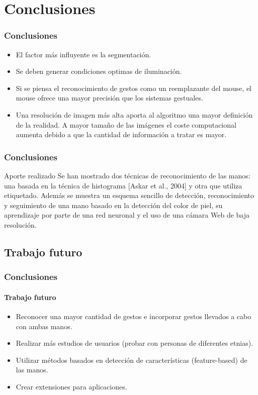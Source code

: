 \documentclass[xcolor=dvipsnames]{beamer}
\begin{document}
	\section{Conclusiones}
	\begin{frame}
		\transdissolve
		\frametitle{Conclusiones}
		\begin{itemize}
		\item El factor más influyente es la segmentación.
		\item Se deben generar condiciones optimas de iluminación.
		\item Si se piensa el reconocimiento de gestos como un reemplazante del mouse, el mouse ofrece una mayor precisión que los sistemas gestuales.
		\item Una resolución de imagen más alta aporta al algoritmo una mayor definición de la realidad. A mayor tamaño de las imágenes el coste computacional aumenta debido a que la cantidad de información a tratar es mayor.
		\end{itemize}
	\end{frame}

	\begin{frame}
		\transdissolve
		\frametitle{Conclusiones}
		\begin{block}{Aporte realizado}
		Se han mostrado dos técnicas de reconocimiento de las manos: una basada en la técnica de histograma {[}Askar et al., 2004{]} y otra que utiliza etiquetado. Además se muestra un esquema sencillo de detección, reconocimiento y seguimiento de una mano basado en la detección del color de piel, su aprendizaje por parte de una red neuronal y el uso de una cámara Web de baja resolución.
		\end{block}
	\end{frame}

		\subsection{Trabajo futuro}
		\begin{frame}
			\transdissolve
			\frametitle{Conclusiones}
			\framesubtitle{Trabajo futuro}
			\begin{itemize}
			\item Reconocer una mayor cantidad de gestos e incorporar gestos llevados a cabo con ambas manos.
			\item Realizar más estudios de usuarios (probar con personas de diferentes etnias).
			\item Utilizar métodos basados en detección de características (feature-based) de las manos.
			\item Crear extensiones para aplicaciones.
			\end{itemize}
		\end{frame}
\end{document}

